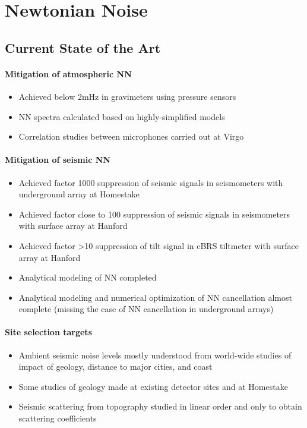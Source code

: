 \section{Newtonian Noise}
\subsection{Current State of the Art}

\paragraph{Mitigation of atmospheric NN}
\begin{itemize}
\item Achieved below 2mHz in gravimeters using pressure sensors
\item NN spectra calculated based on highly-simplified models
\item Correlation studies between microphones carried out at Virgo
\end{itemize}

\paragraph{Mitigation of seismic NN}
\begin{itemize}
\item Achieved factor 1000 suppression of seismic signals in seismometers with underground array at Homestake
\item Achieved factor close to 100 suppression of seismic signals in seismometers with surface array at Hanford
\item Achieved factor >10 suppression of tilt signal in cBRS tiltmeter with surface array at Hanford
\item Analytical modeling of NN completed
\item Analytical modeling and numerical optimization of NN cancellation almost complete (missing the case of NN cancellation in underground arrays)
\end{itemize}

\paragraph{Site selection targets}
\begin{itemize}
\item Ambient seismic noise levels mostly understood from world-wide studies of impact of geology, distance to major cities, and coast
\item Some studies of geology made at existing detector sites and at Homestake
\item Seismic scattering from topography studied in linear order and only to obtain scattering coefficients
\end{itemize}

